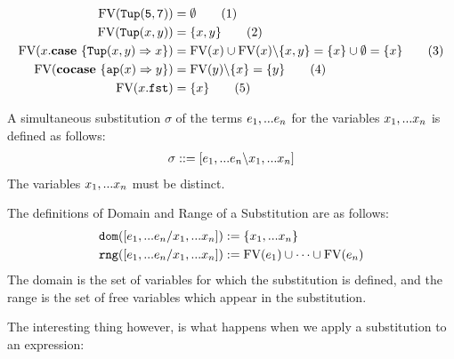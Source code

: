 \documentclass[twoside,12pt,a4paper]{article}
\begin{document}
\begin{example}
    \begin{align*}
        \text{FV}(\mathtt{Tup(5, 7)}) &= \emptyset \tag{1}\\
        \text{FV}(\mathtt{Tup(}x, y\mathtt{)}) &= \{x, y\}\tag{2}\\
        \text{FV}(x.\textbf{case}\ \{\mathtt{Tup(}x, y\mathtt{)}\Rightarrow x\}) 
        &= \text{FV}(x)\cup \text{FV}(x)\backslash\{x, y\} = \{x\}\cup \emptyset = \{x\}\tag{3}\\
        \text{FV}(\textbf{cocase}\ \{\texttt{ap}(x)\Rightarrow y\}) &= \text{FV}(y) \backslash \{x\} = \{y\}\tag{4}\\
        \text{FV}(x.\mathtt{fst}) &= \{x\}\tag{5}
    \end{align*}
\end{example}

\begin{definition}[Substitution]
    A simultaneous substitution $\sigma$ of the terms $e_1,...e_n$ for the variables $x_1,...x_n$ is defined as follows:
    \begin{align*}
        \sigma ::= [e_1,...e_n \backslash x_1,...x_n]
    \end{align*}
    The variables $x_1,...x_n$ must be distinct.
\end{definition}

\begin{definition}
    The definitions of Domain and Range of a Substitution are as follows:
    \begin{align*}
        \texttt{dom}([e_1,...e_n/x_1,...x_n]) &:= \{x_1,...x_n\}\\
        \texttt{rng}([e_1,...e_n/x_1,...x_n]) &:= \text{FV}(e_1)\cup \dots\cup\text{FV}(e_n)
    \end{align*}
    The domain is the set of variables for which the substitution is defined, and
    the range is the set of free variables which appear in the substitution. 
\end{definition}

The interesting thing however, is what happens when we apply a substitution to an expression:
\end{document}
